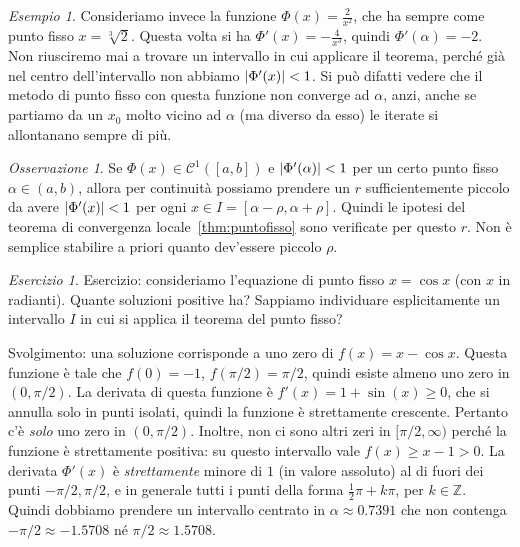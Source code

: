 \documentclass[a4paper]{report}
\DeclarePairedDelimiter{\abs}{\lvert}{\rvert}
\theoremstyle{definiton}
\theoremstyle{remark}
\newtheorem{remark}[theorem]{Osservazione}
\newtheorem{esercizio}[theorem]{Esercizio}
\newtheorem{esempio}[theorem]{Esempio}
\begin{document}
\begin{esempio}
Consideriamo invece la funzione $\Phi(x) = \frac{2}{x^2}$, che ha sempre come punto fisso $x=\sqrt[3]{2}$. Questa volta si ha $\Phi'(x) = -\frac{4}{x^3}$, quindi $\Phi'(\alpha) = -2$. Non riusciremo mai a trovare un intervallo in cui applicare il teorema, perché già nel centro dell'intervallo non abbiamo $\abs{\Phi'(x)}< 1$. Si può difatti vedere che il metodo di punto fisso con questa funzione non converge ad $\alpha$, anzi, anche se partiamo da un $x_0$ molto vicino ad $\alpha$ (ma diverso da esso) le iterate si allontanano sempre di più.
\end{esempio}


\begin{remark} \label{oss:corpuntofisso}
    Se $\Phi(x) \in \mathcal{C}^1([a,b])$ e $\abs{\Phi'(\alpha)} < 1$ per un certo punto fisso $\alpha\in (a,b)$, allora per continuità possiamo prendere un $r$ sufficientemente piccolo da avere $\abs{\Phi'(x)} < 1$ per ogni $x \in I = [\alpha - \rho, \alpha + \rho]$. Quindi le ipotesi del teorema di convergenza locale~\ref{thm:puntofisso} sono verificate per questo $r$. Non è semplice stabilire a priori quanto dev'essere piccolo $\rho$.
\end{remark}
    
\begin{esercizio}
Esercizio: consideriamo l'equazione di punto fisso $x = \cos x$ (con $x$ in radianti). Quante soluzioni positive ha? Sappiamo individuare esplicitamente un intervallo $I$ in cui si applica il teorema del punto fisso?
\end{esercizio}

Svolgimento: una soluzione corrisponde a uno zero di $f(x) = x - \cos x$. Questa funzione è tale che $f(0) = -1$, $f(\pi/2) = \pi/2$, quindi esiste almeno uno zero in $(0,\pi/2)$. La derivata di questa funzione è $f'(x) = 1 + \sin(x) \geq 0$, che si annulla solo in punti isolati, quindi la funzione è strettamente crescente. Pertanto c'è \emph{solo} uno zero in $(0,\pi/2)$. Inoltre, non ci sono altri zeri in $[\pi/2, \infty)$ perché la funzione è strettamente positiva: su questo intervallo vale $f(x) \geq x - 1 > 0$. La derivata $\Phi'(x)$ è \emph{strettamente} minore di $1$ (in valore assoluto) al di fuori dei punti $-\pi/2, \pi/2$, e in generale tutti i punti della forma $\frac12 \pi + k\pi$, per $k\in\mathbb{Z}$. Quindi dobbiamo prendere un intervallo centrato in $\alpha \approx 0.7391$ che non contenga $-\pi/2 \approx -1.5708$ né $\pi/2 \approx 1.5708$.
\end{document}
